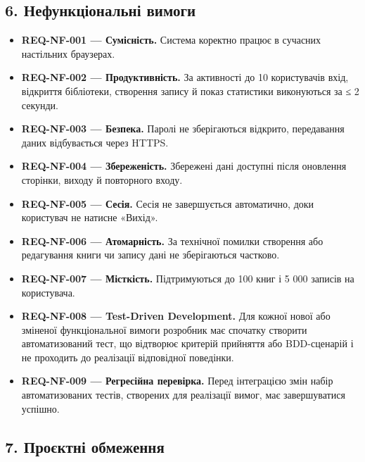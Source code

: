 \documentclass[
]{article}
\providecommand{\tightlist}{%
  \setlength{\itemsep}{0pt}\setlength{\parskip}{0pt}}
\begin{document}
\hypertarget{6-ux43dux435ux444ux443ux43dux43aux446ux456ux43eux43dux430ux43bux44cux43dux456-ux432ux438ux43cux43eux433ux438}{%
\subsection{6. Нефункціональні
вимоги}\label{6-ux43dux435ux444ux443ux43dux43aux446ux456ux43eux43dux430ux43bux44cux43dux456-ux432ux438ux43cux43eux433ux438}}

\begin{itemize}
\tightlist
\item
  \textbf{REQ-NF-001 --- Сумісність.} Система коректно працює в сучасних
  настільних браузерах.
\item
  \textbf{REQ-NF-002 --- Продуктивність.} За активності до 10
  користувачів вхід, відкриття бібліотеки, створення запису й показ
  статистики виконуються за ≤ 2 секунди.
\item
  \textbf{REQ-NF-003 --- Безпека.} Паролі не зберігаються відкрито,
  передавання даних відбувається через HTTPS.
\item
  \textbf{REQ-NF-004 --- Збереженість.} Збережені дані доступні після
  оновлення сторінки, виходу й повторного входу.
\item
  \textbf{REQ-NF-005 --- Сесія.} Сесія не завершується автоматично, доки
  користувач не натисне «Вихід».
\item
  \textbf{REQ-NF-006 --- Атомарність.} За технічної помилки створення
  або редагування книги чи запису дані не зберігаються частково.
\item
  \textbf{REQ-NF-007 --- Місткість.} Підтримуються до 100 книг і 5 000
  записів на користувача.
\item
  \textbf{REQ-NF-008 --- Test-Driven Development.} Для кожної нової або
  зміненої функціональної вимоги розробник має спочатку створити
  автоматизований тест, що відтворює критерій прийняття або BDD-сценарій
  і не проходить до реалізації відповідної поведінки.
\item
  \textbf{REQ-NF-009 --- Регресійна перевірка.} Перед інтеграцією змін
  набір автоматизованих тестів, створених для реалізації вимог, має
  завершуватися успішно.
\end{itemize}

\hypertarget{7-ux43fux440ux43eux454ux43aux442ux43dux456-ux43eux431ux43cux435ux436ux435ux43dux43dux44f}{%
\subsection{7. Проєктні
обмеження}\label{7-ux43fux440ux43eux454ux43aux442ux43dux456-ux43eux431ux43cux435ux436ux435ux43dux43dux44f}}
\end{document}
